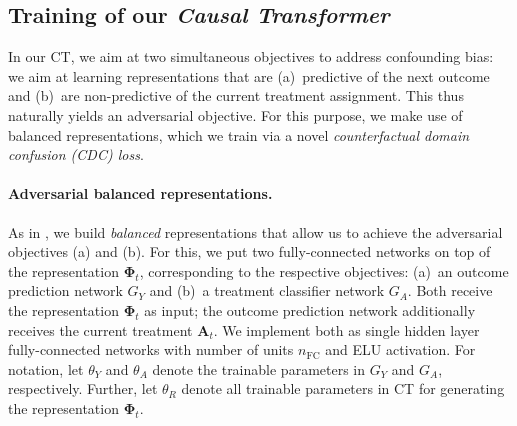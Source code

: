 \documentclass{article}
\theoremstyle{plain}
\theoremstyle{definition}
\theoremstyle{remark}
\newcommand{\longname}{\emph{Causal Transformer}\xspace}
\newcommand{\shortname}{CT\xspace}
\begin{document}
\begin{table}[tbp]
    \caption{Results for semi-synthetic data for $\tau$-step-ahead prediction based on real-world medical data (MIMIC-III). Shown: RMSE as mean $\pm$ standard deviation over five runs. Here: random trajectory setting. MSMs struggle for long prediction horizons with values $>$ 10.0 (due to linear modeling of IPTW scores).}
    \label{tab:ss-sim-all}
    \begin{center}
        \scriptsize
        
    \end{center}
    \vskip -0.27in
\end{table}

\subsection{Training of our \longname} \label{sub-sec:CT-training}

In our \shortname, we aim at two simultaneous objectives to address confounding bias: we aim at learning representations that are (a)~predictive of the next outcome and (b)~are non-predictive of the current treatment assignment. This thus naturally yields an adversarial objective. For this purpose, we make use of balanced representations, which we train via a novel \emph{counterfactual domain confusion (CDC) loss}.

\paragraph{Adversarial balanced representations.} 

As in \cite{bica2020estimating}, we build \emph{balanced} representations that allow us to achieve the adversarial objectives (a) and (b). For this, we put two fully-connected networks on top of the representation $\mathbf{\Phi}_t$, corresponding to the respective objectives: (a)~an outcome prediction network $G_Y$ and (b)~a treatment classifier network $G_A$.  Both receive the representation $\mathbf{\Phi}_t$ as input; the outcome prediction network additionally receives the current treatment $\mathbf{A}_t$. We implement both as single hidden layer fully-connected networks with number of units $n_{\text{FC}}$ and ELU activation. For notation, let $\theta_{Y}$ and $\theta_{A}$  denote the trainable parameters in $G_Y$ and $G_A$, respectively. Further, let $\theta_{R}$ denote all trainable parameters in \shortname for generating the representation $\mathbf{\Phi}_t$. 
\end{document}
